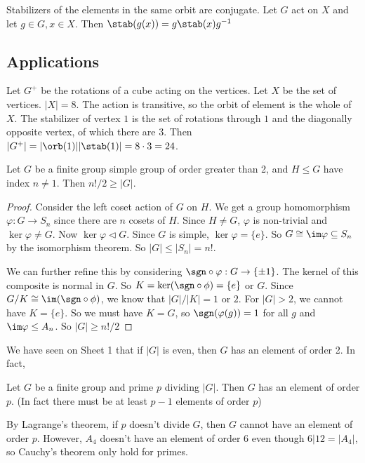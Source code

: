 \documentclass[a4pape]{article}
\begin{document}
\begin{lemma}
  Stabilizers of the elements in the same orbit are conjugate. Let $G$ act on $X$ and let $g\in G, x\in X$. Then $\stab(g(x)) = g\stab(x)g^{-1}$
\end{lemma}

\subsection{Applications}
\begin{eg}
  Let $G^{+}$ be the rotations of a cube acting on the vertices. Let $X$ be the set of vertices. $|X| = 8$. The action is transitive, so the orbit of element is the whole of $X$. The stabilizer of vertex $1$ is the set of rotations through $1$ and the diagonally opposite vertex, of which there are 3. Then $|G^{+}| = |\orb(1)||\stab(1)| = 8\cdot 3 = 24$.
\end{eg}

\begin{eg}
  Let $G$ be a finite group simple group of order greater than 2, and $H\leq G$ have index $n\not= 1$. Then $n!/2 \geq |G|$.
\end{eg}

\begin{proof}
Consider the left coset action of $G$ on $H$. We get a group homomorphism $\varphi: G\to S_n$ since there are $n$ cosets of $H$. Since $H\not= G$, $\varphi$ is non-trivial and $\ker \varphi \not=G$. Now $\ker \varphi \lhd G$. Since $G$ is simple, $\ker\varphi = \{e\}$. So $G\cong \im \varphi \subseteq S_n$ by the isomorphism theorem. So $|G| \leq |S_n| = n!$.

We can further refine this by considering $\sgn\circ \varphi: G \to \{\pm 1\}$. The kernel of this composite is normal in $G$. So $K = \ker(\sgn\circ\phi) = \{e\}$ or $G$. Since $G/K\cong \im (\sgn\circ\phi)$, we know that $|G|/|K| = 1$ or $2$. For $|G|> 2$, we cannot have $K = \{e\}$. So we must have $K = G$, so $\sgn(\varphi(g)) = 1$ for all $g$ and $\im \varphi \leq A_n$. So $|G|\geq n!/2$
\end{proof}

We have seen on Sheet 1 that if $|G|$ is even, then $G$ has an element of order 2. In fact,
\begin{thm}
  Let $G$ be a finite group and prime $p$ dividing $|G|$. Then $G$ has an element of order $p$. (In fact there must be at least $p - 1$ elements of order $p$)

  \note By Lagrange's theorem, if $p$ doesn't divide $G$, then $G$ cannot have an element of order $p$. However, $A_4$ doesn't have an element of order $6$ even though $6 | 12 = |A_4|$, so Cauchy's theorem only hold for primes.
\end{thm}
\end{document}
